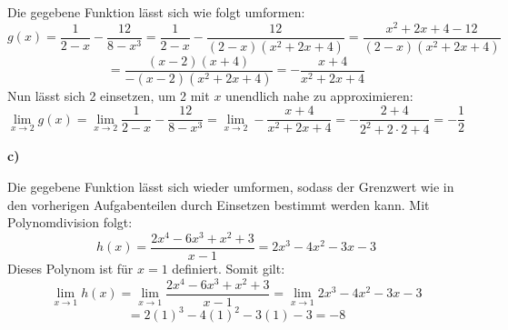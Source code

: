\documentclass[a4paper,graphics,11pt]{article}
\begin{document}
Die gegebene Funktion lässt sich wie folgt umformen:
$$
    g(x) = \frac{1}{2-x} - \frac{12}{8-x^3}
    = \frac{1}{2-x} - \frac{12}{(2-x)(x^2+2x+4)} 
    = \frac{x^2+2x+4-12}{(2-x)(x^2+2x+4)}
$$$$
    = \frac{(x-2)(x+4)}{-(x-2)(x^2+2x+4)}
    = -\frac{x+4}{x^2+2x+4}
$$
Nun lässt sich 2 einsetzen, um 2 mit $x$ unendlich nahe zu approximieren:
$$
    \lim_{x \to 2} g(x)
    = \lim_{x \to 2} \frac{1}{2-x} - \frac{12}{8-x^3}
    = \lim_{x \to 2} -\frac{x+4}{x^2+2x+4}
    = - \frac{2+4}{2^2+2\cdot 2 +4}
    = -\frac{1}{2}
$$

\textbf{c)}

Die gegebene Funktion lässt sich wieder umformen, sodass der Grenzwert wie in den vorherigen
Aufgabenteilen durch Einsetzen bestimmt werden kann. Mit Polynomdivision folgt:
$$
    h(x) = \frac{2x^4-6x^3+x^2+3}{x-1} = 2x^3-4x^2-3x-3
$$
Dieses Polynom ist für $x=1$ definiert. Somit gilt:
$$
    \lim_{x \to 1} h(x)
    = \lim_{x \to 1} \frac{2x^4-6x^3+x^2+3}{x-1}
    = \lim_{x \to 1} 2x^3-4x^2-3x-3
$$$$
    = 2(1)^3-4(1)^2-3(1)-3 = -8
$$
\end{document}

